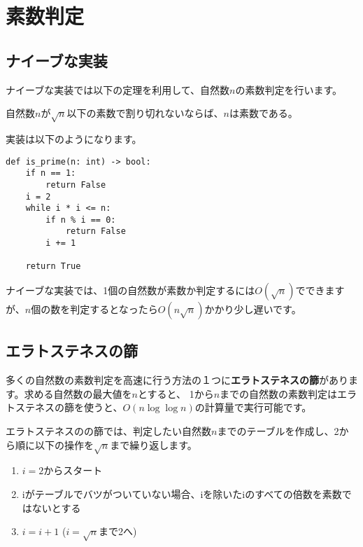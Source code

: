 \documentclass{jlreq}
\begin{document}
\section{素数判定}

\subsection{ナイーブな実装}

ナイーブな実装では以下の定理を利用して、自然数$n$の素数判定を行います。

\begin{tcolorbox}[enhanced,title=定理1, 
  attach boxed title to top left, 
  colback=white!95!blue,
  colbacktitle=white!10!blue!50!black,
  drop fuzzy shadow,
  boxrule=0.25mm,
  ]
  自然数$n$が$\sqrt{n}$以下の素数で割り切れないならば、$n$は素数である。
\end{tcolorbox}
実装は以下のようになります。

\begin{lstlisting}[caption=ナイーブな素数判定, frame=TRBL, label={naivePriem}]
def is_prime(n: int) -> bool:
    if n == 1:
        return False
    i = 2
    while i * i <= n:
        if n % i == 0:
            return False
        i += 1
    
    return True

\end{lstlisting}

ナイーブな実装では、1個の自然数が素数か判定するには$O(\sqrt{n})$でできますが、$n$個の数を判定するとなったら$O(n \sqrt{n})$かかり少し遅いです。

\subsection{エラトステネスの篩}
多くの自然数の素数判定を高速に行う方法の１つに\textbf{エラトステネスの篩}があります。求める自然数の最大値を$n$とすると、
1から$n$までの自然数の素数判定はエラトステネスの篩を使うと、$O(n \log \log n)$の計算量で実行可能です。

エラトステネスのの篩では、判定したい自然数$n$までのテーブルを作成し、2から順に以下の操作を$\sqrt{n}$まで繰り返します。

\begin{enumerate}
  \item $i = 2$からスタート
  \item iがテーブルでバツがついていない場合、iを除いたiのすべての倍数を素数ではないとする
  \item $i = i + 1$ ($i = \sqrt{n}$まで2へ)
\end{enumerate}
\end{document}
